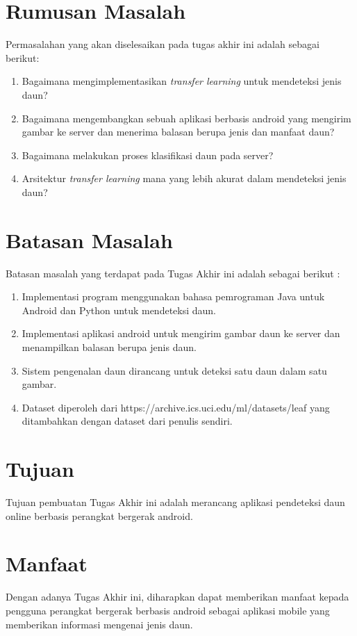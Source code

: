 \section {Rumusan Masalah}

Permasalahan yang akan diselesaikan pada tugas akhir ini adalah sebagai berikut:

\begin {enumerate}
\item Bagaimana mengimplementasikan \textit{transfer learning} untuk mendeteksi jenis daun? 
\item Bagaimana mengembangkan sebuah aplikasi berbasis android yang mengirim gambar ke server dan menerima balasan berupa jenis dan manfaat daun?
\item Bagaimana melakukan proses klasifikasi daun pada server?
\item Arsitektur \textit{transfer learning} mana yang lebih akurat dalam mendeteksi jenis daun? 
\end {enumerate}

\section {Batasan Masalah}

Batasan masalah yang terdapat pada Tugas Akhir ini adalah sebagai berikut : 
\begin {enumerate}
\item Implementasi program menggunakan bahasa pemrograman Java untuk Android dan Python untuk mendeteksi daun. 
\item Implementasi aplikasi android untuk mengirim gambar daun ke server dan menampilkan balasan berupa jenis daun.
\item Sistem pengenalan daun dirancang untuk deteksi satu daun dalam satu gambar. 
\item Dataset diperoleh dari https://archive.ics.uci.edu/ml/datasets/leaf yang ditambahkan dengan dataset dari penulis sendiri. 
\end {enumerate}

\section {Tujuan}

Tujuan pembuatan Tugas Akhir ini adalah merancang aplikasi pendeteksi daun online berbasis perangkat bergerak android. 

\section{Manfaat}
Dengan adanya Tugas Akhir ini, diharapkan dapat memberikan manfaat kepada pengguna perangkat bergerak berbasis android sebagai aplikasi mobile yang memberikan informasi mengenai jenis daun. 

